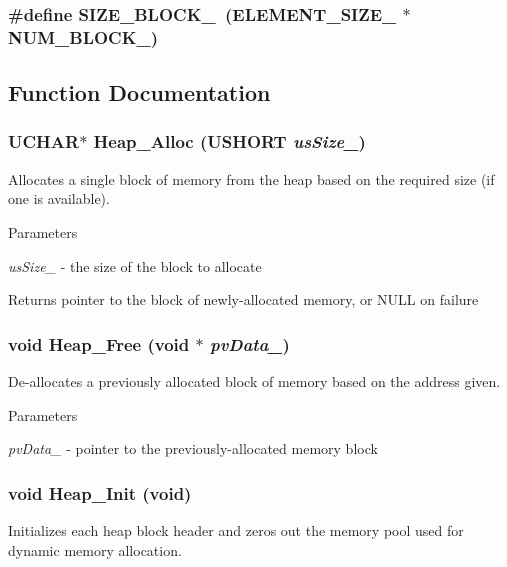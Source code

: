 \subsubsection[{SIZE\_\-BLOCK\_\-5}]{\setlength{\rightskip}{0pt plus 5cm}\#define SIZE\_\-BLOCK\_~(ELEMENT\_\-SIZE\_ $\ast$ NUM\_\-BLOCK\_)}\label{heap_8h_af6620b400b551dc99000133b7c5a694a}


\subsection{Function Documentation}
\subsubsection[{Heap\_\-Alloc}]{\setlength{\rightskip}{0pt plus 5cm}UCHAR$\ast$ Heap\_\-Alloc (USHORT {\em usSize\_\-})}\label{heap_8h_a6a8e3e3b87a02aa2b0fb726b2dc67295}
Allocates a single block of memory from the heap based on the required size (if one is available).


\begin{DoxyParams}{Parameters}
\item[{\em usSize\_\-}]-\/ the size of the block to allocate \end{DoxyParams}
\begin{DoxyReturn}{Returns}
pointer to the block of newly-\/allocated memory, or NULL on failure 
\end{DoxyReturn}
\subsubsection[{Heap\_\-Free}]{\setlength{\rightskip}{0pt plus 5cm}void Heap\_\-Free (void $\ast$ {\em pvData\_\-})}\label{heap_8h_a26781ec4e59e14d49e5083019a453e1c}
De-\/allocates a previously allocated block of memory based on the address given.


\begin{DoxyParams}{Parameters}
\item[{\em pvData\_\-}]-\/ pointer to the previously-\/allocated memory block \end{DoxyParams}
\subsubsection[{Heap\_\-Init}]{\setlength{\rightskip}{0pt plus 5cm}void Heap\_\-Init (void)}\label{heap_8h_a69bb83782a1700fca779167755464e11}
Initializes each heap block header and zeros out the memory pool used for dynamic memory allocation. 